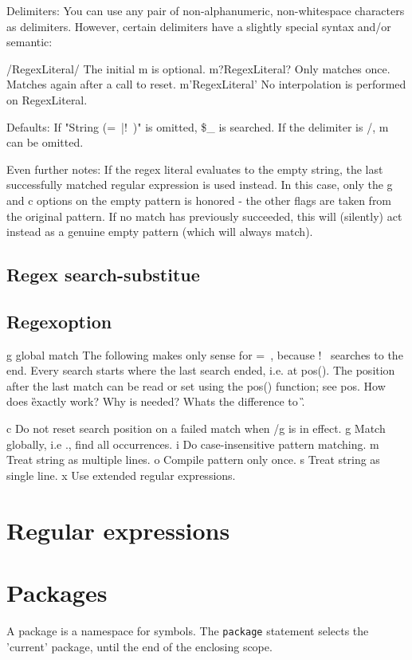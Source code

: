 \documentclass{article}
\begin{document}
\begin{description}
{Delimiters: You can use any pair of non-alphanumeric, non-whitespace characters
as delimiters. However, certain delimiters have a slightly special syntax and/or
semantic:

/RegexLiteral/ The initial m is optional.
m?RegexLiteral? Only matches once. Matches again after a call to reset.
m'RegexLiteral' No interpolation is performed on RegexLiteral.

Defaults: If "String (=~|!~)" is omitted, \$\_ is searched. If the delimiter is /,
m can be omitted.

Even further notes: If the regex literal evaluates to the empty string, the last
successfully matched regular expression is used instead. In this case, only the
g and c options on the empty pattern is honored - the other flags are taken from
the original pattern. If no match has previously succeeded, this will (silently)
act instead as a genuine empty pattern (which will always match).

\subsection{Regex search-substitue}

\subsection{Regexoption}

g global match
The following makes only sense for =~, because !~ searches to the end.
Every search starts where the last search ended, i.e. at pos(). The position after the last match can be read or set using the pos() function; see pos.
How does \G exactly work? Why is needed? Whats the difference to \G.

    c	Do not reset search position on a failed match when /g is in effect.
    g	Match globally, i.e
., find all occurrences.
    i	Do case-insensitive pattern matching.
    m	Treat string as multiple lines.
    o	Compile pattern only once.
    s	Treat string as single line.
    x	Use extended regular expressions.

\section{Regular expressions}    
\section{Packages}
A package is a namespace for symbols. The \verb|package| statement
selects the 'current' package, until the end of the enclosing scope.

}
\end{description}
\end{document}

